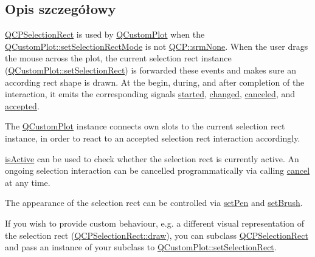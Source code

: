 \subsection{Opis szczegółowy}
\hyperlink{class_q_c_p_selection_rect}{Q\+C\+P\+Selection\+Rect} is used by \hyperlink{class_q_custom_plot}{Q\+Custom\+Plot} when the \hyperlink{class_q_custom_plot_a810ef958ebe84db661c7288b526c0deb}{Q\+Custom\+Plot\+::set\+Selection\+Rect\+Mode} is not \hyperlink{namespace_q_c_p_ac9aa4d6d81ac76b094f9af9ad2d3aacfa9032f170490d67240a6c68c2638ffab1}{Q\+C\+P\+::srm\+None}. When the user drags the mouse across the plot, the current selection rect instance (\hyperlink{class_q_custom_plot_a0c09f96df15faa4799ad7051bb16cf33}{Q\+Custom\+Plot\+::set\+Selection\+Rect}) is forwarded these events and makes sure an according rect shape is drawn. At the begin, during, and after completion of the interaction, it emits the corresponding signals \hyperlink{class_q_c_p_selection_rect_a7b7162d19f4f2174d3644ff1a5d335aa}{started}, \hyperlink{class_q_c_p_selection_rect_a1bab11026bca52740c2e6682623e6964}{changed}, \hyperlink{class_q_c_p_selection_rect_aeb82009393c90130102dccf36477b906}{canceled}, and \hyperlink{class_q_c_p_selection_rect_a15a43542e1f7b953a44c260b419e6d2c}{accepted}.

The \hyperlink{class_q_custom_plot}{Q\+Custom\+Plot} instance connects own slots to the current selection rect instance, in order to react to an accepted selection rect interaction accordingly.

\hyperlink{class_q_c_p_selection_rect_a5eb64ab5638c04a952e230de3766470e}{is\+Active} can be used to check whether the selection rect is currently active. An ongoing selection interaction can be cancelled programmatically via calling \hyperlink{class_q_c_p_selection_rect_af67bc58f4f5ce9a4dc420b9c42de235a}{cancel} at any time.

The appearance of the selection rect can be controlled via \hyperlink{class_q_c_p_selection_rect_ada20b7fb1b2dcbe50523262636b06963}{set\+Pen} and \hyperlink{class_q_c_p_selection_rect_ab0c66f1484418782efa01f4153611080}{set\+Brush}.

If you wish to provide custom behaviour, e.\+g. a different visual representation of the selection rect (\hyperlink{class_q_c_p_selection_rect_ab0e50ae796508bdcd97ab8c335c593bf}{Q\+C\+P\+Selection\+Rect\+::draw}), you can subclass \hyperlink{class_q_c_p_selection_rect}{Q\+C\+P\+Selection\+Rect} and pass an instance of your subclass to \hyperlink{class_q_custom_plot_a0c09f96df15faa4799ad7051bb16cf33}{Q\+Custom\+Plot\+::set\+Selection\+Rect}. 

